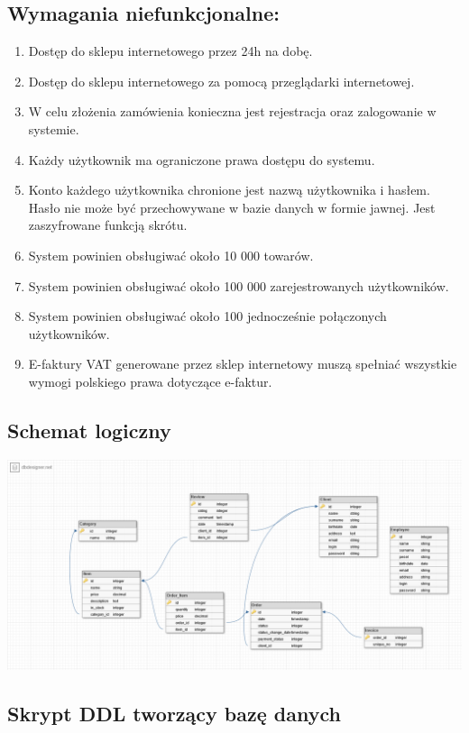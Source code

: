 \documentclass[10pt,a4paper]{article}
\begin{document}
    \subsection{Wymagania niefunkcjonalne:}
      \begin{enumerate}
	    \item Dostęp do sklepu internetowego przez 24h na dobę.
	    \item Dostęp do sklepu internetowego za pomocą przeglądarki internetowej.
		\item W celu złożenia zamówienia konieczna jest rejestracja oraz zalogowanie w systemie.
		\item Każdy użytkownik ma ograniczone prawa dostępu do systemu.
		\item Konto każdego użytkownika chronione jest nazwą użytkownika i hasłem. Hasło nie może być przechowywane w bazie 				  danych w formie jawnej. Jest zaszyfrowane funkcją skrótu.
		\item System powinien obsługiwać około 10 000 towarów.
		\item System powinien obsługiwać około 100 000 zarejestrowanych użytkowników.
		\item System powinien obsługiwać około 100 jednocześnie połączonych użytkowników.
		\item E-faktury VAT generowane przez sklep internetowy muszą spełniać wszystkie wymogi 
			  polskiego prawa dotyczące e-faktur. 
	   \end{enumerate}
	  \newpage
      \subsection{Schemat logiczny}
        \includegraphics[scale=0.2]{schematlogiczny}
      \newpage
      \subsection{Skrypt DDL tworzący bazę danych}
		 
\end{document}
